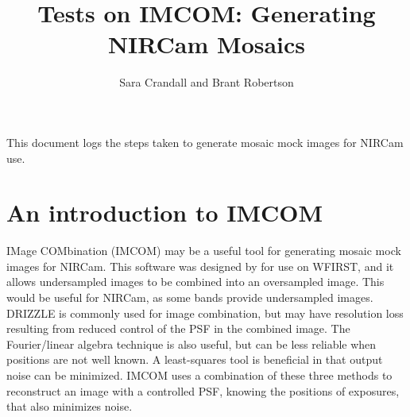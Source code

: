 \documentclass[12pt,preprint]{aastex6}
\begin{document}
\title{Tests on IMCOM: Generating NIRCam Mosaics}

\author{Sara Crandall and Brant Robertson}


\section*{}
\begin{center}
This document logs the steps taken to generate mosaic mock images for NIRCam use.
\end{center}




\maketitle
\section{An introduction to IMCOM}
IMage COMbination (IMCOM) may be a useful tool for generating mosaic mock images for NIRCam. This software was designed by \cite{Rowe2011} for use on WFIRST, and it allows undersampled images to be combined into an oversampled image. This would be useful for NIRCam, as some bands provide undersampled images. DRIZZLE is commonly used for image combination, but may have resolution loss resulting from reduced control of the PSF in the combined image. The Fourier/linear algebra technique is also useful, but can be less reliable when positions are not well known. A least-squares tool is beneficial in that output noise can be minimized. IMCOM uses a combination of these three methods to reconstruct an image with a controlled PSF, knowing the positions of exposures, that also minimizes noise. 
\end{document}
